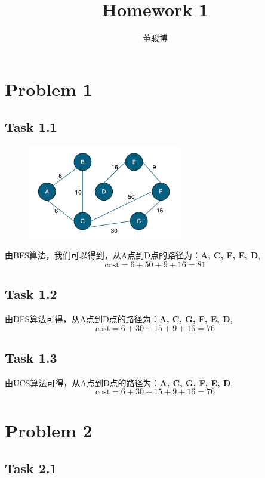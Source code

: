 \documentclass[onecolumn,oneside]{SUSTechHomework}
\author{董骏博}
\title{Homework 1}
\begin{document}
    \maketitle
  
    \section*{Problem 1}
    \subsection*{Task 1.1}
    \begin{figure}[h]
        \centering
        \includegraphics[width=0.6\textwidth]{task1.png} %
        \label{fig:example} %
    \end{figure}
    由BFS算法，我们可以得到，从A点到D点的路径为：\textbf{A, C, F, E, D},\[\text{cost} = 6 + 50 + 9 + 16 = 81 \]
    \subsection*{Task 1.2}
    由DFS算法可得，从A点到D点的路径为：\textbf{A, C, G, F, E, D},\[\text{cost} = 6 + 30 + 15 + 9 + 16 = 76 \]
    \subsection*{Task 1.3}
    由UCS算法可得，从A点到D点的路径为：\textbf{A, C, G, F, E, D},\[\text{cost} = 6 + 30 + 15 + 9 + 16 = 76 \]
    \section*{Problem 2}
    \subsection*{Task 2.1}
    
\end{document}
